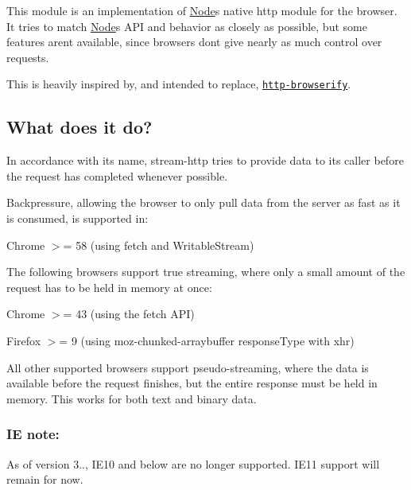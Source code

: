 \href{https://saucelabs.com/u/stream-http}{\tt }

This module is an implementation of \mbox{\hyperlink{classNode}{Node}}\textquotesingle{}s native {\ttfamily http} module for the browser. It tries to match \mbox{\hyperlink{classNode}{Node}}\textquotesingle{}s A\+PI and behavior as closely as possible, but some features aren\textquotesingle{}t available, since browsers don\textquotesingle{}t give nearly as much control over requests.

This is heavily inspired by, and intended to replace, \href{https://github.com/substack/http-browserify}{\tt http-\/browserify}.

\subsection*{What does it do?}

In accordance with its name, {\ttfamily stream-\/http} tries to provide data to its caller before the request has completed whenever possible.

Backpressure, allowing the browser to only pull data from the server as fast as it is consumed, is supported in\+:
\begin{DoxyItemize}
\item Chrome $>$= 58 (using {\ttfamily fetch} and {\ttfamily Writable\+Stream})
\end{DoxyItemize}

The following browsers support true streaming, where only a small amount of the request has to be held in memory at once\+:
\begin{DoxyItemize}
\item Chrome $>$= 43 (using the {\ttfamily fetch} A\+PI)
\item Firefox $>$= 9 (using {\ttfamily moz-\/chunked-\/arraybuffer} response\+Type with xhr)
\end{DoxyItemize}

All other supported browsers support pseudo-\/streaming, where the data is available before the request finishes, but the entire response must be held in memory. This works for both text and binary data.

\subsubsection*{IE note\+:}

As of version 3.., I\+E10 and below are no longer supported. I\+E11 support will remain for now.

